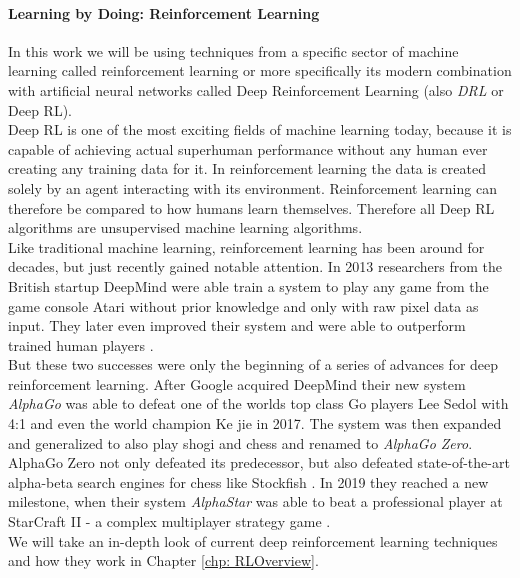  \paragraph{Learning by Doing: Reinforcement Learning} In this work we will be using techniques from a specific sector of machine learning called reinforcement learning or more specifically its modern combination with artificial neural networks called Deep Reinforcement Learning (also \textit{DRL} or Deep RL). \\
 Deep RL is one of the most exciting fields of machine learning today, because it is capable of achieving actual superhuman performance without any human ever creating any training data for it. In reinforcement learning the data is created solely by an agent interacting with its environment. Reinforcement learning can therefore be compared to how humans learn themselves. Therefore all Deep RL algorithms are unsupervised machine learning algorithms. \\ 
 Like traditional machine learning, reinforcement learning has been around for decades, but just recently gained notable attention. In 2013 researchers from the British startup DeepMind were able train a system to play any game from the game console Atari without prior knowledge and only with raw pixel data as input. \cite{mnih2013playing} They later even improved their system and were able to outperform trained human players \cite{mnih2015human}. \\
 But these two successes were only the beginning of a series of advances for deep reinforcement learning. After Google acquired DeepMind their new system \textit{AlphaGo} was able to defeat one of the worlds top class Go players Lee Sedol with 4:1 \cite{borowiec2016alphago} and even the world champion Ke jie in 2017. The system was then expanded and generalized to also play shogi and chess and renamed to \textit{AlphaGo Zero}. AlphaGo Zero not only defeated its predecessor, but also defeated state-of-the-art alpha-beta search engines for chess like Stockfish \cite{silver2017mastering}. In 2019 they reached a new milestone, when their system \textit{AlphaStar} was able to beat a professional player at StarCraft II - a complex multiplayer strategy game \cite{arulkumaran2019alphastar}. \\
We will take an in-depth look of current deep reinforcement learning techniques and how they work in Chapter \ref{chp: RLOverview}.


